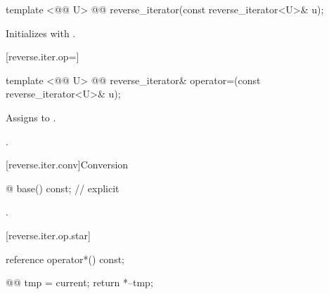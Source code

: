 %

\begin{itemdecl}
template <@@ U>
  @@
reverse_iterator(const reverse_iterator<U>& u);
\end{itemdecl}

\begin{itemdescr}
\pnum
\effects
Initializes
with
.
\end{itemdescr}

[reverse.iter.op=]{}

%
\begin{itemdecl}
template <@@ U>
  @@
reverse_iterator&
  operator=(const reverse_iterator<U>& u);
\end{itemdecl}

\begin{itemdescr}
\pnum
\effects
Assigns  to .

\pnum
\returns
{}.
\end{itemdescr}

[reverse.iter.conv]{Conversion}

%
%
\begin{itemdecl}
@ base() const;          // explicit
\end{itemdecl}

\begin{itemdescr}
\pnum
\returns
{}.
\end{itemdescr}

[reverse.iter.op.star]{}

%
\begin{itemdecl}
reference operator*() const;
\end{itemdecl}

\begin{itemdescr}
\pnum
\effects
\begin{codeblock}
@@ tmp = current;
return *--tmp;
\end{codeblock}

\end{itemdescr}


